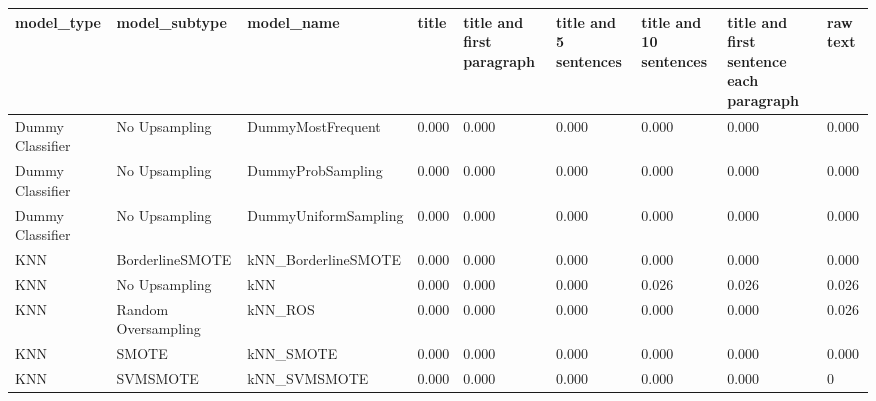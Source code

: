 \begin{tabular}{lllllllll}
\toprule
                  model\_type &       model\_subtype &                                   model\_name & title & title and first paragraph & title and 5 sentences & title and 10 sentences & title and first sentence each paragraph & raw text \\
\midrule
            Dummy Classifier &       No Upsampling &                            DummyMostFrequent & 0.000 &                     0.000 &                 0.000 &                  0.000 &                                   0.000 &    0.000 \\
            Dummy Classifier &       No Upsampling &                            DummyProbSampling & 0.000 &                     0.000 &                 0.000 &                  0.000 &                                   0.000 &    0.000 \\
            Dummy Classifier &       No Upsampling &                         DummyUniformSampling & 0.000 &                     0.000 &                 0.000 &                  0.000 &                                   0.000 &    0.000 \\
                         KNN &     BorderlineSMOTE &                          kNN\_BorderlineSMOTE & 0.000 &                     0.000 &                 0.000 &                  0.000 &                                   0.000 &    0.000 \\
                         KNN &       No Upsampling &                                          kNN & 0.000 &                     0.000 &                 0.000 &                  0.026 &                                   0.026 &    0.026 \\
                         KNN & Random Oversampling &                                      kNN\_ROS & 0.000 &                     0.000 &                 0.000 &                  0.000 &                                   0.000 &    0.026 \\
                         KNN &               SMOTE &                                    kNN\_SMOTE & 0.000 &                     0.000 &                 0.000 &                  0.000 &                                   0.000 &    0.000 \\
                         KNN &            SVMSMOTE &                                 kNN\_SVMSMOTE & 0.000 &                     0.000 &                 0.000 &                  0.000 &                                   0.000 &        0 \\

\end{tabular}
